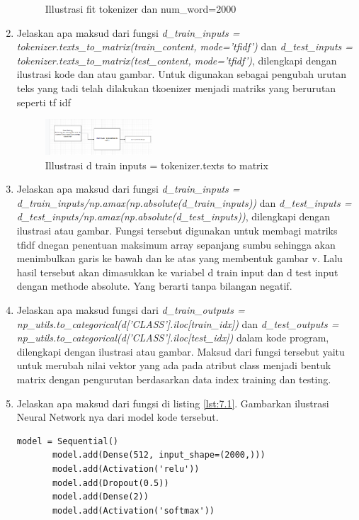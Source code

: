 \begin{enumerate}
\begin{figure}[H]
    \centering
    \caption{Illustrasi fit tokenizer dan num\_word=2000}
\end{figure}
\item
Jelaskan apa maksud dari fungsi \emph{d\_train\_inputs = tokenizer.texts\_to\_matrix(train\_content, mode='tfidf')} dan \emph{d\_test\_inputs = tokenizer.texts\_to\_matrix(test\_content, mode='tfidf')}, dilengkapi dengan ilustrasi kode dan atau gambar.
Untuk digunakan sebagai pengubah urutan teks yang tadi telah dilakukan tkoenizer menjadi matriks yang berurutan seperti tf idf
\begin{figure}[H]
    \includegraphics[width=4cm]{figures/1174035/chapter7/teori_6.png}
    \centering
    \caption{Illustrasi d train inputs = tokenizer.texts to matrix}
\end{figure}
\item
Jelaskan apa maksud dari fungsi \emph{d\_train\_inputs = d\_train\_inputs/np.amax(np.absolute(d\_train\_inputs))} dan \emph{d\_test\_inputs = d\_test\_inputs/np.amax(np.absolute(d\_test\_inputs))}, dilengkapi dengan ilustrasi atau gambar.
Fungsi tersebut digunakan untuk membagi matriks tfidf dnegan penentuan maksimum array sepanjang sumbu sehingga akan menimbulkan garis ke bawah dan ke atas yang membentuk gambar v. Lalu hasil tersebut akan dimasukkan ke variabel d train input dan d test input dengan methode absolute. Yang berarti tanpa bilangan negatif.
\item
Jelaskan apa maksud fungsi dari \emph{d\_train\_outputs = np\_utils.to\_categorical(d['CLASS'].iloc[train\_idx])} dan \emph{d\_test\_outputs = np\_utils.to\_categorical(d['CLASS'].iloc[test\_idx])} dalam kode program, dilengkapi dengan ilustrasi atau gambar.
Maksud dari fungsi tersebut yaitu untuk merubah nilai vektor yang ada pada atribut class menjadi bentuk matrix dengan pengurutan berdasarkan data index training dan testing.
\item
Jelaskan apa maksud dari fungsi di listing \ref{lst:7.1}. Gambarkan ilustrasi Neural Network nya dari model kode tersebut.
\begin{lstlisting}[caption=Membuat model Neural Network,label={lst:7.1}]
       model = Sequential()
       model.add(Dense(512, input_shape=(2000,)))
       model.add(Activation('relu'))
       model.add(Dropout(0.5))
       model.add(Dense(2))
       model.add(Activation('softmax'))
\end{lstlisting}

\end{enumerate}
